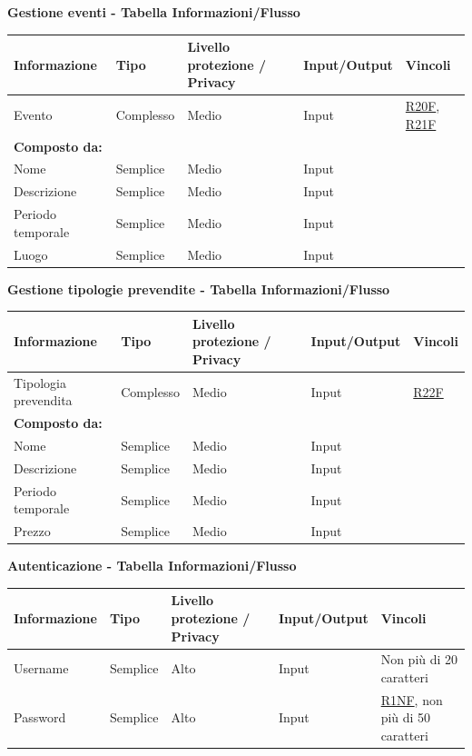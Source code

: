 \documentclass[a4paper]{article}
\begin{document}
\newpage

\textbf{Gestione eventi  - Tabella Informazioni/Flusso}

\begin{center}
    \begin{tabularx}{1\textwidth}{|X|X|X|X|X|}
        \hline
        \textbf{Informazione} &\textbf{Tipo} & \textbf{Livello protezione / Privacy} & \textbf{Input/Output} & \textbf{Vincoli}\\
        \hline
        \hline
        Evento & Complesso & Medio & Input & \hyperlink{R20F}{R20F}, \hyperlink{R21F}{R21F} \\
        \textbf{Composto da:} & & & & \\
        Nome & Semplice & Medio & Input & \\
        Descrizione & Semplice & Medio & Input & \\
        Periodo temporale & Semplice & Medio & Input & \\
        Luogo & Semplice & Medio & Input & \\
        \hline
    \end{tabularx}
\end{center}

\textbf{Gestione tipologie prevendite  - Tabella Informazioni/Flusso}

\begin{center}
    \begin{tabularx}{1\textwidth}{|X|X|X|X|X|}
        \hline
        \textbf{Informazione} &\textbf{Tipo} & \textbf{Livello protezione / Privacy} & \textbf{Input/Output} & \textbf{Vincoli}\\
        \hline
        \hline
        Tipologia prevendita & Complesso & Medio & Input & \hyperlink{R22F}{R22F} \\
        \textbf{Composto da:} & & & & \\
        Nome & Semplice & Medio & Input & \\
        Descrizione & Semplice & Medio & Input & \\
        Periodo temporale & Semplice & Medio & Input & \\
        Prezzo & Semplice & Medio & Input & \\
        \hline
    \end{tabularx}
\end{center}

\textbf{Autenticazione  - Tabella Informazioni/Flusso}

\begin{center}
    \begin{tabularx}{1\textwidth}{|X|X|X|X|X|}
        \hline
        \textbf{Informazione} &\textbf{Tipo} & \textbf{Livello protezione / Privacy} & \textbf{Input/Output} & \textbf{Vincoli}\\
        \hline
        \hline
        Username & Semplice & Alto & Input & Non più di 20 caratteri\\
        \hline
        Password & Semplice & Alto & Input & \hyperlink{R1NF}{R1NF}, non più di 50 caratteri\\
        \hline
    \end{tabularx}
\end{center}
\end{document}
